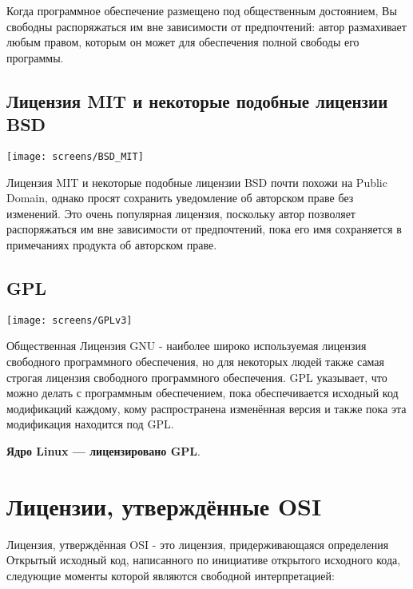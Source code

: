 \documentclass[12pt]{book}
\begin{document}
\vspace{-4mm}

Когда программное обеспечение размещено под общественным достоянием, Вы свободны  распоряжаться им вне зависимости от предпочтений: автор размахивает любым правом, которым он может для обеспечения полной свободы его программы.

\subsection{Лицензия MIT и некоторые подобные лицензии  BSD}

\begin{center}\texttt{[image: screens/BSD\_MIT]}\end{center}

\vspace{-4mm}

Лицензия MIT и некоторые подобные лицензии BSD почти похожи на Public Domain, однако просят сохранить уведомление об авторском праве без изменений. Это очень популярная лицензия, поскольку автор позволяет распоряжаться им вне зависимости от предпочтений, пока его имя сохраняется в примечаниях продукта об авторском праве.

\subsection{GPL}

\begin{center}\texttt{[image: screens/GPLv3]}\end{center}

\vspace{-4mm}

Общественная Лицензия GNU - наиболее широко используемая лицензия свободного программного обеспечения, но для некоторых людей также самая строгая лицензия свободного программного обеспечения. GPL указывает, что можно делать с программным обеспечением, пока обеспечивается исходный код модификаций каждому, кому распространена изменённая версия и также пока эта модификация находится под GPL.

\textbf{Ядро Linux --- лицензировано GPL}.

\section{Лицензии, утверждённые OSI}

Лицензия, утверждённая OSI - это лицензия, придерживающаяся определения Открытый исходный код, написанного по инициативе открытого исходного кода, следующие моменты которой являются свободной интерпретацией:
\end{document}
